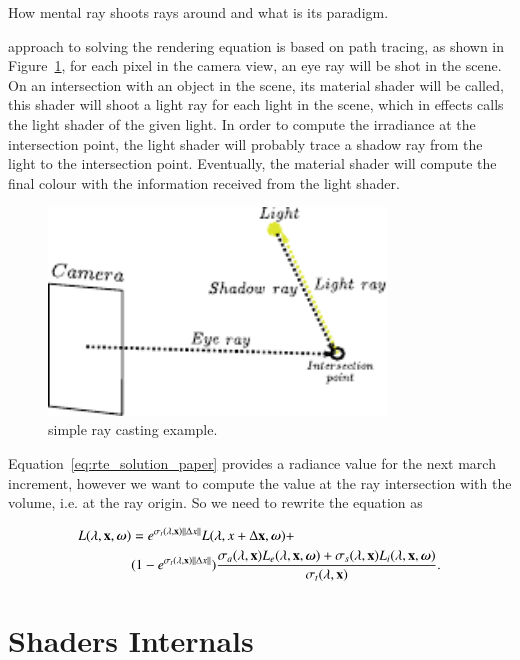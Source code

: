 How mental ray shoots rays around and what is its paradigm.

\MentalRay approach to solving the rendering equation is based on path tracing, as shown in Figure~\ref{fig:mental_ray_model}, for each pixel in the camera view, an eye ray will be shot in the scene.
On an intersection with an object in the scene, its material shader will be called, this shader will shoot a light ray for each light in the scene, which in effects calls the light shader of the given light.
In order to compute the irradiance at the intersection point, the light shader will probably trace a shadow ray from the light to the intersection point.
Eventually, the material shader will compute the final colour with the information received from the light shader. 

\begin{figure}[htbp!]
\centering
\includegraphics[width=0.8\textwidth]{img/mental_ray_model}
	\caption{\MentalRay simple ray casting example.}
	\label{fig:mental_ray_model}
\end{figure}

Equation~\ref{eq:rte_solution_paper} provides a radiance value for the next march increment, however we want to compute the value at the ray intersection with the volume, i.e. at the ray origin.
So we need to rewrite the equation as

\begin{equation}
\begin{split}
L(\lambda, \mathbf{x}, \boldsymbol{\omega}) &= e^{\sigma_t(\lambda, \mathbf{x}) \left \| \Delta x \right \|} L(\lambda, x + \Delta\mathbf{x}, \boldsymbol{\omega}) +  \\
& (1 - e^{\sigma_t(\lambda, \mathbf{x}) \left \| \Delta x \right \|} ) \frac{\sigma_a(\lambda, \mathbf{x}) L_e(\lambda, \mathbf{x}, \boldsymbol{\omega}) + \sigma_s(\lambda, \mathbf{x}) L_i(\lambda, \mathbf{x}, \boldsymbol{\omega})}{\sigma_t(\lambda, \mathbf{x})}.
\end{split}
\end{equation}

\section{Shaders Internals}
\label{sec:shaders_internals}

